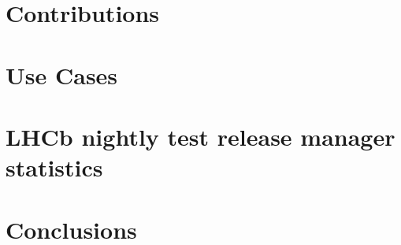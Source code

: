 \documentclass[a4paper,10pt,twoside]{report}
\begin{document}
\chapter{Contributions}


\chapter{Use Cases}


\chapter{LHCb nightly test release manager statistics}


\chapter{Conclusions}


% 
% 

\clearpage %
\appendix
{} %


\end{document}
